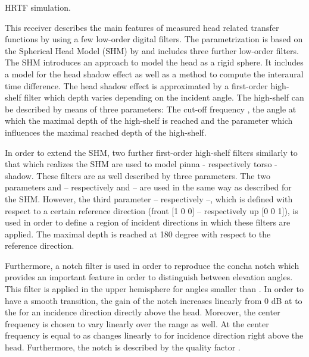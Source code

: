HRTF simulation.

This receiver describes the main features of measured head related transfer
functions by using a few low-order digital filters. The parametrization is
based on the Spherical Head Model (SHM) by \citet{BrownDuda}
and includes three further low-order filters. The SHM introduces an approach
to model the head as a rigid sphere. It includes a model for the head shadow
effect as well as a method to compute the interaural time difference.
The head shadow effect is approximated by a first-order high-shelf filter
which depth varies depending on the incident angle. The high-shelf can be
described by means of three parameters: The cut-off frequency ,
the angle  at which the maximal depth of the high-shelf is
reached and the parameter  which influences the maximal
reached depth of the high-shelf.

In order to extend the SHM, two further first-order high-shelf filters
similarly to that which realizes the SHM are used to model pinna
- respectively torso - shadow. These filters are as well described by
three parameters. The two parameters  and
 -- respectively  and
 -- are used in the same way as described for the SHM.
However, the third parameter  -- respectively
 --, which is defined with respect to a certain
reference direction (front [1 0 0] -- respectively up [0 0 1]), is used
in order to define a region of incident directions in which these filters
are applied. The maximal depth is reached at 180 degree with respect to
the reference direction.

Furthermore, a notch filter is used in order to reproduce the concha notch
which provides an important feature in order to distinguish between elevation
angles. This filter is applied in the upper hemisphere for angles smaller
than . In order to have a smooth transition, the
gain of the notch increases linearly from 0 dB at 
to the  for an incidence direction directly above the head.
Moreover, the center frequency is chosen to vary linearly over the range
as well. At  the center frequency is equal to
 as changes linearly to  for incidence
direction right above the head. Furthermore, the notch is described by the
quality factor .

